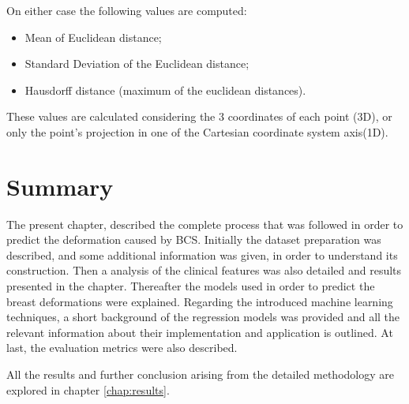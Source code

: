 On either case the following values are computed:
\begin{itemize}
\item Mean of Euclidean distance;
\item Standard Deviation of the Euclidean distance;
\item Hausdorff distance (maximum of the euclidean distances).
\end{itemize}

These values are calculated considering the 3 coordinates of each point (3D), or only the point's projection in one of the Cartesian coordinate system axis(1D).


\section{Summary}

The present chapter, described the complete process that was followed in order to predict the deformation caused by BCS. Initially the dataset preparation was described, and some additional information was given, in order to understand its construction. Then a analysis of the clinical features was also detailed and results presented in the chapter. Thereafter the models used in order to predict the breast deformations were explained. Regarding the introduced machine learning techniques, a short background of the regression models was provided and all the relevant information about their implementation and application is outlined. At last, the evaluation metrics were also described.

All the results and further conclusion arising from the detailed methodology are explored in chapter \ref{chap:results}. 



